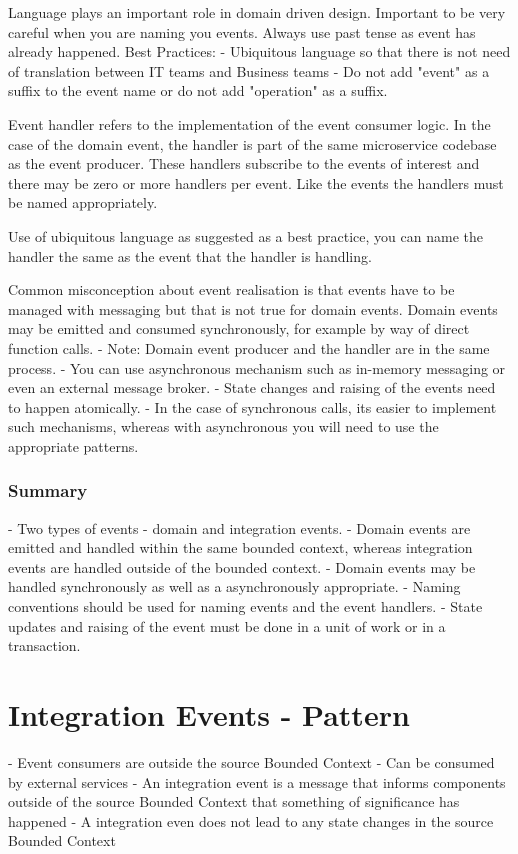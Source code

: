 \documentclass[a4paper, 11pt]{book}
\begin{document}
    Language plays an important role in domain driven design. Important to be very careful when you are naming you events.
    Always use past tense as event has already happened.
    Best Practices:
    - Ubiquitous language so that there is not need of translation between IT teams and Business teams
    - Do not add "event" as a suffix to the event name or do not add "operation" as a suffix.

    Event handler refers to the implementation of the event consumer logic.
    In the case of the domain event, the handler is part of the same microservice codebase as the event producer.
    These handlers subscribe to the events of interest and there may be zero or more handlers per event.
    Like the events the handlers must be named appropriately.

    Use of ubiquitous language as suggested as a best practice, you can name the handler the same as the event that the handler is handling.

    Common misconception about event realisation is that events have to be managed with messaging but that is not true for domain events.
    Domain events may be emitted and consumed synchronously, for example by way of direct function calls.
    - Note: Domain event producer and the handler are in the same process.
    - You can use asynchronous mechanism such as in-memory messaging or even an external message broker.
    - State changes and raising of the events need to happen atomically.
    - In the case of synchronous calls, its easier to implement such mechanisms, whereas with asynchronous you will need to use the appropriate patterns.

    \subsubsection{Summary}
    - Two types of events - domain and integration events.
    - Domain events are emitted and handled within the same bounded context, whereas integration events are handled outside of the bounded context.
    - Domain events may be handled synchronously as well as a asynchronously appropriate.
    - Naming conventions should be used for naming events and the event handlers.
    - State updates and raising of the event must be done in a unit of work or in a transaction.


    \section{Integration Events - Pattern}
    - Event consumers are outside the source Bounded Context
    - Can be consumed by external services
    - An integration event is a message that informs components outside of the source Bounded Context that something of significance has happened
    - A integration even does not lead to any state changes in the source Bounded Context
\end{document}
